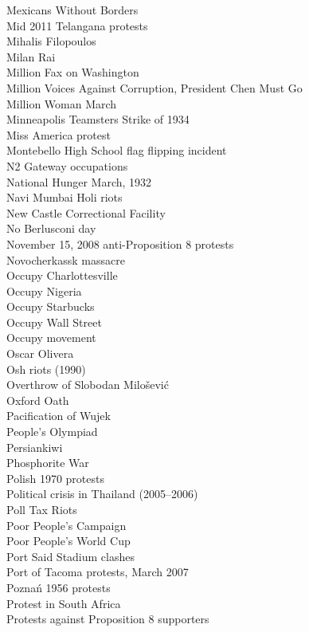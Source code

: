 Mexicans Without Borders\\
Mid 2011 Telangana protests\\
Mihalis Filopoulos\\
Milan Rai\\
Million Fax on Washington\\
Million Voices Against Corruption, President Chen Must Go\\
Million Woman March\\
Minneapolis Teamsters Strike of 1934\\
Miss America protest\\
Montebello High School flag flipping incident\\
N2 Gateway occupations\\
National Hunger March, 1932\\
Navi Mumbai Holi riots\\
New Castle Correctional Facility\\
No Berlusconi day\\
November 15, 2008 anti-Proposition 8 protests\\
Novocherkassk massacre\\
Occupy Charlottesville\\
Occupy Nigeria\\
Occupy Starbucks\\
Occupy Wall Street\\
Occupy movement\\
Oscar Olivera\\
Osh riots (1990)\\
Overthrow of Slobodan Milošević\\
Oxford Oath\\
Pacification of Wujek\\
People's Olympiad\\
Persiankiwi\\
Phosphorite War\\
Polish 1970 protests\\
Political crisis in Thailand (2005–2006)\\
Poll Tax Riots\\
Poor People's Campaign\\
Poor People's World Cup\\
Port Said Stadium clashes\\
Port of Tacoma protests, March 2007\\
Poznań 1956 protests\\
Protest in South Africa\\
Protests against Proposition 8 supporters\\
